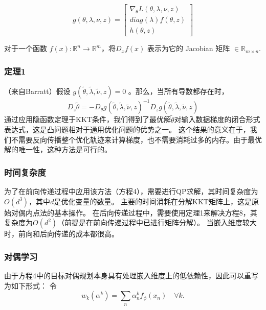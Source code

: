 \begin{equation}
    g(\theta, \lambda, \nu, z ) = \left [
        \begin{array}{l}
            \nabla_\theta L(\theta, \lambda, \nu,z)\\
            diag(\lambda)f(\theta, z)\\
            h(\theta, z)
        \end{array}
        \right ]
\end{equation}

对于一个函数 $f(x) : \mathbb{R}^n \rightarrow \mathbb{R}^m$，将$D_xf(x)$ 表示为它的 Jacobian 矩阵 $\in \mathbb{R}_{m\times n}$.

\subsubsection{定理1}
（来自Barratt）假设 $g(\tilde{\theta}, \tilde{\lambda}, \tilde{\nu}, z  ) = 0$ 。那么，当所有导数都存在时，
\begin{equation}
    D_z\tilde{\theta} = -D_{\theta}g(\tilde{\theta}, \tilde{\lambda}, \tilde{\nu}, z)^{-1}D_zg(\tilde{\theta}, \tilde{\lambda}, \tilde{\nu}, z)
\end{equation}
通过应用隐函数定理于KKT条件，我们得到了最优解$\tilde{\theta}$对输入数据梯度的闭合形式表达式，这是凸问题相对于通用优化问题的优势之一。
这个结果的意义在于，我们不需要反向传播整个优化轨迹来计算梯度，也不需要消耗过多的内存。由于最优解的唯一性，这种方法是可行的。

\subsubsection{时间复杂度}
为了在前向传递过程中应用该方法（方程4），需要进行QP求解，其时间复杂度为$O(d^3)$，其中$d$是优化变量的数量。
主要的时间消耗在分解KKT矩阵上，这是原始对偶内点法的基本操作。
在后向传递过程中，需要使用定理1来解决方程8，其复杂度为$O(d^2)$（前提是在前向传递过程中已进行矩阵分解）。
当嵌入维度较大时，前向和后向传递的成本都很高。

\subsubsection{对偶学习}

由于方程4中的目标对偶规划本身具有处理嵌入维度上的低依赖性，因此可以重写为如下形式：
令
\begin{equation}
    w_{k}(\alpha^{k}) = \sum_{n}{\alpha_{n}^{k} f_{\phi}(x_{n})} \quad \forall k.
\end{equation}

